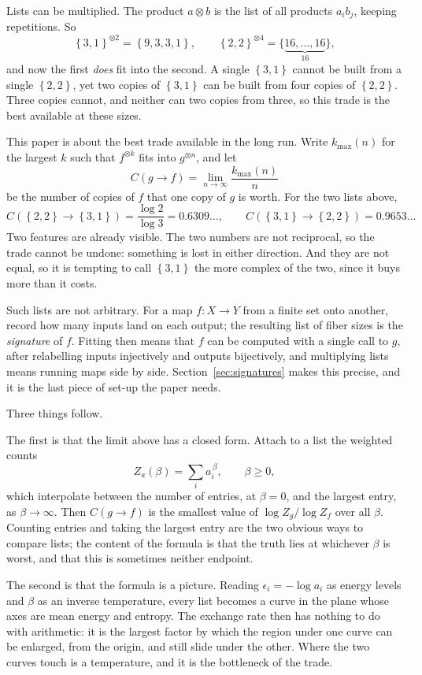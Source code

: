 \documentclass[11pt]{article}
\theoremstyle{definition}
\theoremstyle{remark}
\newcommand{\sig}[1]{\left\{#1\right\}}
\begin{document}
Lists can be multiplied.  The product \(a\otimes b\) is the list of all
products \(a_ib_j\), keeping repetitions.  So
\[
  \sig{3,1}^{\otimes2}=\sig{9,3,3,1},
  \qquad
  \sig{2,2}^{\otimes4}=\{\underbrace{16,\ldots,16}_{16}\},
\]
and now the first \emph{does} fit into the second.  A single \(\sig{3,1}\)
cannot be built from a single \(\sig{2,2}\), yet two copies of \(\sig{3,1}\)
can be built from four copies of \(\sig{2,2}\).  Three copies cannot, and
neither can two copies from three, so this trade is the best available at
these sizes.

This paper is about the best trade available in the long run.  Write
\(k_{\max}(n)\) for the largest \(k\) such that \(f^{\otimes k}\) fits into
\(g^{\otimes n}\), and let
\[
  C(g\to f)=\lim_{n\to\infty}\frac{k_{\max}(n)}{n}
\]
be the number of copies of \(f\) that one copy of \(g\) is worth.  For the two
lists above,
\[
  C(\sig{2,2}\to\sig{3,1})=\frac{\log2}{\log3}=0.6309\ldots,
  \qquad
  C(\sig{3,1}\to\sig{2,2})=0.9653\ldots
\]
Two features are already visible.  The two numbers are not reciprocal, so the
trade cannot be undone: something is lost in either direction.  And they are
not equal, so it is tempting to call \(\sig{3,1}\) the more complex of the
two, since it buys more than it costs.

Such lists are not arbitrary.  For a map \(f:X\to Y\) from a finite set onto
another, record how many inputs land on each output; the resulting list of
fiber sizes is the \emph{signature} of \(f\).  Fitting then means that \(f\)
can be computed with a single call to \(g\), after relabelling inputs
injectively and outputs bijectively, and multiplying lists means running maps
side by side.  Section~\ref{sec:signatures} makes this precise, and it is the
last piece of set-up the paper needs.

Three things follow.

The first is that the limit above has a closed form.  Attach to a list the
weighted counts
\[
  Z_a(\beta)=\sum_i a_i^{\,\beta},\qquad\beta\geq0,
\]
which interpolate between the number of entries, at \(\beta=0\), and the
largest entry, as \(\beta\to\infty\).  Then \(C(g\to f)\) is the smallest
value of \(\log Z_g/\log Z_f\) over all \(\beta\).  Counting entries and
taking the largest entry are the two obvious ways to compare lists; the
content of the formula is that the truth lies at whichever \(\beta\) is worst,
and that this is sometimes neither endpoint.

The second is that the formula is a picture.  Reading
\(\epsilon_i=-\log a_i\) as energy levels and \(\beta\) as an inverse
temperature, every list becomes a curve in the plane whose
axes are mean energy and entropy.  The exchange rate then has nothing to do
with arithmetic: it is the largest factor by which the region under one curve
can be enlarged, from the origin, and still slide under the other.  Where the
two curves touch is a temperature, and it is the bottleneck of the trade.
\end{document}
